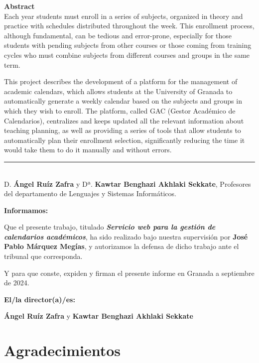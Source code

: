 \noindent\textbf{Abstract}\\

Each year students must enroll in a series of subjects, organized in theory and practice with schedules distributed throughout the week. This enrollment process, although fundamental, can be tedious and error-prone, especially for those students with pending subjects from other courses or those coming from training cycles who must combine subjects from different courses and groups in the same term.\newline

This project describes the development of a platform for the management of academic calendars, which allows students at the University of Granada to automatically generate a weekly calendar based on the subjects and groups in which they wish to enroll. The platform, called GAC (Gestor Académico de Calendarios), centralizes and keeps updated all the relevant information about teaching planning, as well as providing a series of tools that allow students to automatically plan their enrollment selection, significantly reducing the time it would take them to do it manually and without errors.

\cleardoublepage

\thispagestyle{empty}

\noindent\rule[-1ex]{\textwidth}{2pt}\\[4.5ex]

D. \textbf{Ángel Ruíz Zafra} y Dª. \textbf{Kawtar Benghazi Akhlaki Sekkate}, Profesores del departamento de Lenguajes y Sistemas Informáticos.
\vspace{0.5cm}

\textbf{Informamos:}

\vspace{0.5cm}

Que el presente trabajo, titulado \textit{\textbf{Servicio web para la gestión de calendarios académicos}},
ha sido realizado bajo nuestra supervisión por \textbf{José Pablo Márquez Megías}, y autorizamos la defensa de dicho trabajo ante el tribunal
que corresponda.

\vspace{0.5cm}

Y para que conste, expiden y firman el presente informe en Granada a septiembre de 2024.

\vspace{1cm}

\textbf{El/la director(a)/es: }

\vspace{5cm}

\noindent \textbf{Ángel Ruíz Zafra} y \textbf{Kawtar Benghazi Akhlaki Sekkate}

\chapter*{Agradecimientos}






